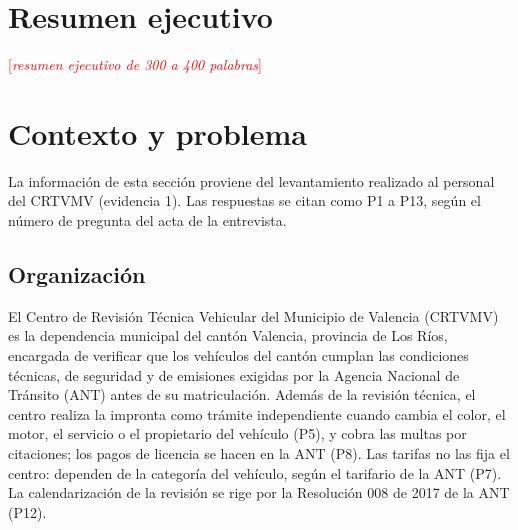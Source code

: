 \documentclass[11pt,a4paper]{article}
\newcommand{\pendiente}[1]{\textcolor{red}{[\textit{#1}]}}
\begin{document}
\tableofcontents
\newpage

\section*{Resumen ejecutivo}
\pendiente{resumen ejecutivo de 300 a 400 palabras}

\section{Contexto y problema}
La información de esta sección proviene del levantamiento realizado al personal del CRTVMV (evidencia 1). Las respuestas se citan como P1 a P13, según el número de pregunta del acta de la entrevista.

\subsection{Organización}
El Centro de Revisión Técnica Vehicular del Municipio de Valencia (CRTVMV) es la dependencia municipal del cantón Valencia, provincia de Los Ríos, encargada de verificar que los vehículos del cantón cumplan las condiciones técnicas, de seguridad y de emisiones exigidas por la Agencia Nacional de Tránsito (ANT) antes de su matriculación. Además de la revisión técnica, el centro realiza la impronta como trámite independiente cuando cambia el color, el motor, el servicio o el propietario del vehículo (P5), y cobra las multas por citaciones; los pagos de licencia se hacen en la ANT (P8). Las tarifas no las fija el centro: dependen de la categoría del vehículo, según el tarifario de la ANT (P7). La calendarización de la revisión se rige por la Resolución 008 de 2017 de la ANT (P12).
\end{document}

